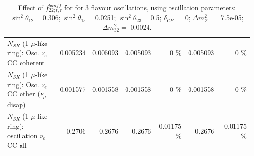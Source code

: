 \begin{table}
\begin{tabular}{| l | r | r | r  r | r  r |}
                          $N_{SK}$ (1 $\mu$-like ring): Osc. $\nu_e$ CC coherent &        0.005234 &        0.005093 &        0.005093 &        0 \%  &        0.005093 &        0 \%  \\ 
           $N_{SK}$ (1 $\mu$-like ring): Osc. $\nu_e$ CC other ($\nu_\mu$ disap) &        0.001577 &        0.001558 &        0.001558 &        0 \%  &        0.001558 &        0 \%  \\ 
                        $N_{SK}$ (1 $\mu$-like ring): oscillation $\nu_e$ CC all &          0.2706 &          0.2676 &          0.2676 &  0.01175 \%  &          0.2676 & -0.01175 \%  \\ 
\hline
\hline
\end{tabular}
\caption{ Effect of $f_{22; t, r}^{banff}$ for for 3 flavour oscillations, using oscillation parameters:  $\sin^2\theta_{12} = $0.306; $\sin^2\theta_{13} = $0.0251; $\sin^2\theta_{23} = $0.5; $\delta_{CP} = $        0; $\Delta m^2_{21} = $    7.5e-05; $\Delta m^2_{32} = $    0.0024. }
\label{tab:num_banff_cc1piE1_1RmuT_3f_osc_t13:0.0251}
\end{table}
\clearpage
